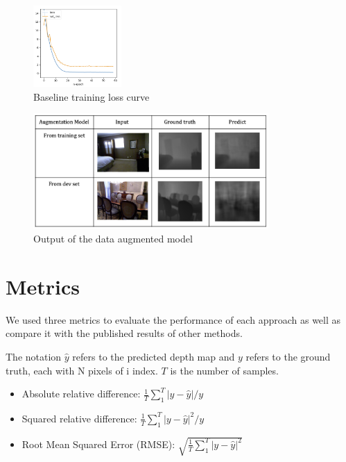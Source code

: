 \documentclass{article}
\begin{document}
\begin{figure}
    \centering
    \includegraphics[width=0.3\textwidth]{images/loss.png}
    \caption{Baseline training loss curve}
    \label{fig:loss-curve}
\end{figure}

\begin{figure}[hbt!]
    \centering
    \includegraphics[width=0.8\textwidth]{images/augmented-model-output.png}
    \caption{Output of the data augmented model}
    \label{fig:augmentation-output}
\end{figure}

\section{Metrics}
    We used three metrics to evaluate the performance of each approach as well as compare it with the published results of other methods. 
    
    The notation $\hat{y}$ refers to the predicted depth map and $y$ refers to the ground truth, each with N pixels of i index. $T$ is the number of samples.

\begin{itemize}
    \item Absolute relative difference: $\frac{1}{T}\sum_1^T|y-\hat{y}|/y$
    \item Squared relative difference: $\frac{1}{T}\sum_1^T|y-\hat{y}|^2/y$
    \item Root Mean Squared Error (RMSE): $\sqrt{\frac{1}{T}\sum_1^T|y-\hat{y}|^2}$
\end{itemize}
\end{document}
